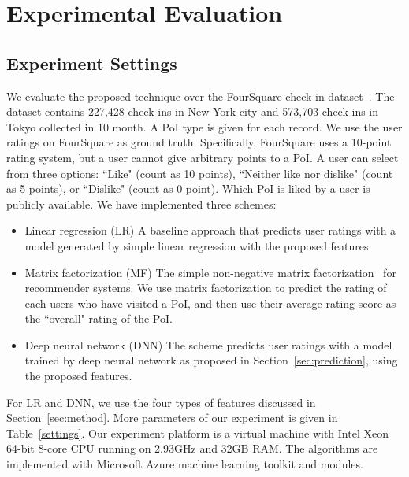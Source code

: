 \section{Experimental Evaluation}\label{sec:exp}

\subsection{Experiment Settings}

We evaluate the proposed technique over the FourSquare check-in dataset~\cite{yang2014modeling}. The dataset contains 227,428 check-ins in New York city and 573,703 check-ins in Tokyo collected in 10 month. A PoI type is given for each record. We use the user ratings on FourSquare as ground truth. Specifically, FourSquare uses a 10-point rating system, but a user cannot give arbitrary points to a PoI. A user can select from three options: ``Like" (count as 10 points), ``Neither like nor dislike" (count as 5 points), or ``Dislike" (count as 0 point). Which PoI is liked by a user is publicly available. We have implemented three schemes:
\begin{itemize}
\item{Linear regression (LR)} A baseline approach that predicts user ratings with a model generated by simple linear regression with the proposed features.
\item{Matrix factorization (MF)} The simple non-negative matrix factorization~\cite{koren2009matrix} for recommender systems. We use matrix factorization to predict the rating of each users who have visited a PoI, and then use their average rating score as the ``overall" rating of the PoI.
\item{Deep neural network (DNN)} The scheme predicts user ratings with a model trained by deep neural network as proposed in Section~\ref{sec:prediction}, using the proposed features.
\end{itemize}

For LR and DNN, we use the four types of features discussed in Section~\ref{sec:method}. More parameters of our experiment is given in Table~\ref{settings}. Our experiment platform is a virtual machine with Intel Xeon 64-bit 8-core CPU running on 2.93GHz and 32GB RAM. The algorithms are implemented with Microsoft Azure machine learning toolkit and modules. 


